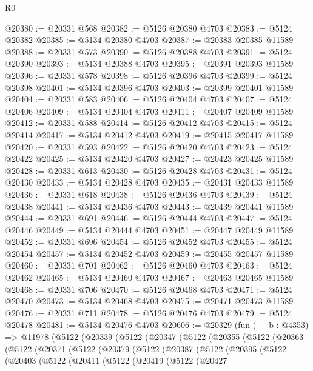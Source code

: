 \begin{lexlean}{R0}
\begin{coremodule}
@20380 := @20331 @568
@20382 := @5126 @20380 @4703
@20383 := @5124 @20382
@20385 := @5134 @20380 @4703
@20387 := @20383 @20385 @11589
@20388 := @20331 @573
@20390 := @5126 @20388 @4703
@20391 := @5124 @20390
@20393 := @5134 @20388 @4703
@20395 := @20391 @20393 @11589
@20396 := @20331 @578
@20398 := @5126 @20396 @4703
@20399 := @5124 @20398
@20401 := @5134 @20396 @4703
@20403 := @20399 @20401 @11589
@20404 := @20331 @583
@20406 := @5126 @20404 @4703
@20407 := @5124 @20406
@20409 := @5134 @20404 @4703
@20411 := @20407 @20409 @11589
@20412 := @20331 @588
@20414 := @5126 @20412 @4703
@20415 := @5124 @20414
@20417 := @5134 @20412 @4703
@20419 := @20415 @20417 @11589
@20420 := @20331 @593
@20422 := @5126 @20420 @4703
@20423 := @5124 @20422
@20425 := @5134 @20420 @4703
@20427 := @20423 @20425 @11589
@20428 := @20331 @613
@20430 := @5126 @20428 @4703
@20431 := @5124 @20430
@20433 := @5134 @20428 @4703
@20435 := @20431 @20433 @11589
@20436 := @20331 @618
@20438 := @5126 @20436 @4703
@20439 := @5124 @20438
@20441 := @5134 @20436 @4703
@20443 := @20439 @20441 @11589
@20444 := @20331 @691
@20446 := @5126 @20444 @4703
@20447 := @5124 @20446
@20449 := @5134 @20444 @4703
@20451 := @20447 @20449 @11589
@20452 := @20331 @696
@20454 := @5126 @20452 @4703
@20455 := @5124 @20454
@20457 := @5134 @20452 @4703
@20459 := @20455 @20457 @11589
@20460 := @20331 @701
@20462 := @5126 @20460 @4703
@20463 := @5124 @20462
@20465 := @5134 @20460 @4703
@20467 := @20463 @20465 @11589
@20468 := @20331 @706
@20470 := @5126 @20468 @4703
@20471 := @5124 @20470
@20473 := @5134 @20468 @4703
@20475 := @20471 @20473 @11589
@20476 := @20331 @711
@20478 := @5126 @20476 @4703
@20479 := @5124 @20478
@20481 := @5134 @20476 @4703
@20606 := @20329
    (fun (__b : @4353) =>
    @11978
      (@5122
        (@20339
          (@5122
            (@20347
              (@5122
                (@20355
                  (@5122
                    (@20363
                      (@5122
                        (@20371
                          (@5122
                            (@20379
                              (@5122
                                (@20387
                                  (@5122
                                    (@20395
                                      (@5122
                                        (@20403
                                          (@5122
                                            (@20411
                                              (@5122
                                                (@20419
                                                  (@5122
                                                    (@20427

\end{coremodule}
\end{lexlean}

